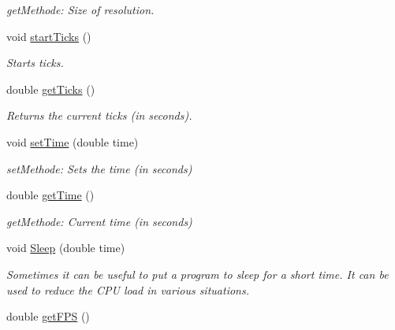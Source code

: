 \begin{DoxyCompactItemize}
\begin{DoxyCompactList}\small\item\em getMethode: Size of resolution. \item\end{DoxyCompactList}\item 
\hypertarget{class_f2_c_1_1_window_a0e50551a924c0c13757b892e5b17fdce}{
void \hyperlink{class_f2_c_1_1_window_a0e50551a924c0c13757b892e5b17fdce}{startTicks} ()}
\label{class_f2_c_1_1_window_a0e50551a924c0c13757b892e5b17fdce}

\begin{DoxyCompactList}\small\item\em Starts ticks. \item\end{DoxyCompactList}\item 
\hypertarget{class_f2_c_1_1_window_a40e7bde6336371496cf95cac06fb02c6}{
double \hyperlink{class_f2_c_1_1_window_a40e7bde6336371496cf95cac06fb02c6}{getTicks} ()}
\label{class_f2_c_1_1_window_a40e7bde6336371496cf95cac06fb02c6}

\begin{DoxyCompactList}\small\item\em Returns the current ticks (in seconds). \item\end{DoxyCompactList}\item 
\hypertarget{class_f2_c_1_1_window_a1ea7f6ad0371c7b7a40196c3e16fff55}{
void \hyperlink{class_f2_c_1_1_window_a1ea7f6ad0371c7b7a40196c3e16fff55}{setTime} (double time)}
\label{class_f2_c_1_1_window_a1ea7f6ad0371c7b7a40196c3e16fff55}

\begin{DoxyCompactList}\small\item\em setMethode: Sets the time (in seconds) \item\end{DoxyCompactList}\item 
\hypertarget{class_f2_c_1_1_window_afcc4b6bc63531041421463538f1af179}{
double \hyperlink{class_f2_c_1_1_window_afcc4b6bc63531041421463538f1af179}{getTime} ()}
\label{class_f2_c_1_1_window_afcc4b6bc63531041421463538f1af179}

\begin{DoxyCompactList}\small\item\em getMethode: Current time (in seconds) \item\end{DoxyCompactList}\item 
void \hyperlink{class_f2_c_1_1_window_a1ee9014047dc994e2b32de4910ad6c49}{Sleep} (double time)
\begin{DoxyCompactList}\small\item\em Sometimes it can be useful to put a program to sleep for a short time. It can be used to reduce the CPU load in various situations. \item\end{DoxyCompactList}\item 
\hypertarget{class_f2_c_1_1_window_aa6fe96cb49214cf71e822d7d7493e648}{
double \hyperlink{class_f2_c_1_1_window_aa6fe96cb49214cf71e822d7d7493e648}{getFPS} ()}
\label{class_f2_c_1_1_window_aa6fe96cb49214cf71e822d7d7493e648}


\end{DoxyCompactItemize}
